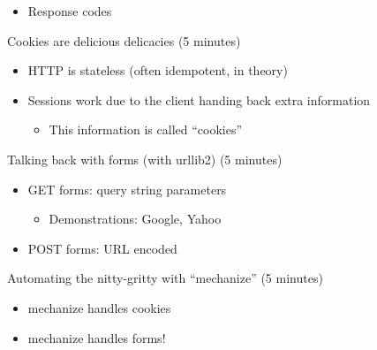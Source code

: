 \documentclass[10pt,a4paper,english]{article}
\begin{document}
\begin{itemize}
\item {} 
Response codes

\end{itemize}
\setcounter{listcnt0}{0}
\begin{list}{.}
{
\addtocounter{listcnt0}{5}
\setlength{\rightmargin}{\leftmargin}
}
\item {} 
Cookies are delicious delicacies (5 minutes)

\end{list}
\begin{itemize}
\item {} 
HTTP is stateless (often idempotent, in theory)

\item {} 
Sessions work due to the client handing back extra information
\begin{itemize}
\item {} 
This information is called ``cookies''

\end{itemize}

\end{itemize}
\setcounter{listcnt0}{0}
\begin{list}{.}
{
\addtocounter{listcnt0}{6}
\setlength{\rightmargin}{\leftmargin}
}
\item {} 
Talking back with forms (with urllib2) (5 minutes)

\end{list}
\begin{itemize}
\item {} 
GET forms: query string parameters
\begin{itemize}
\item {} 
Demonstrations: Google, Yahoo

\end{itemize}

\item {} 
POST forms: URL encoded

\end{itemize}
\setcounter{listcnt0}{0}
\begin{list}{.}
{
\addtocounter{listcnt0}{7}
\setlength{\rightmargin}{\leftmargin}
}
\item {} 
Automating the nitty-gritty with ``mechanize'' (5 minutes)

\end{list}
\begin{itemize}
\item {} 
mechanize handles cookies

\item {} 
mechanize handles forms!

\end{itemize}
\end{document}
